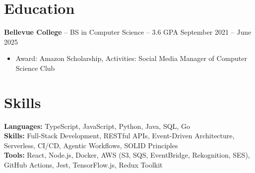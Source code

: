 \documentclass[11pt]{article}
\begin{document}

\vspace{-18.5pt}

\section*{Education}
\textbf{Bellevue College} -- BS in Computer Science -- 3.6 GPA \hfill September 2021 -- June 2025\\
\vspace{-9pt}
\begin{itemize}
  \item Award: Amazon Scholarship, Activities: Social Media Manager of Computer Science Club
\end{itemize}

\vspace{-18.5pt}

\section*{Skills}
\textbf{Languages:} TypeScript, JavaScript, Python, Java, SQL, Go\\
\textbf{Skills:} Full-Stack Development, RESTful APIs, Event-Driven Architecture, Serverless, CI/CD, Agentic Workflows, SOLID Principles\\
\textbf{Tools:} React, Node.js, Docker, AWS (S3, SQS, EventBridge, Rekognition, SES), GitHub Actions, Jest, TensorFlow.js, Redux Toolkit\\

\vspace{-6.5pt}
\end{document}
